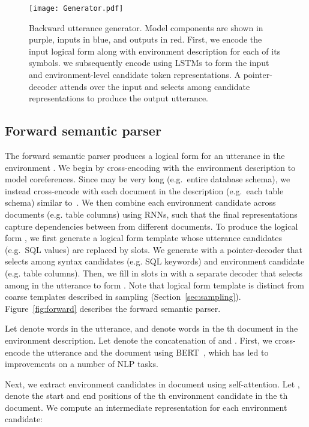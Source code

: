 \documentclass[11pt,a4paper]{article}
\begin{document}
\begin{figure*}[t]
    \centering
    \texttt{[image: Generator.pdf]}
    \caption{
    Backward utterance generator.
    Model components are shown in purple, inputs in blue, and outputs in red.
    First, we encode the input logical form along with environment description for each of its symbols.
    we subsequently encode using LSTMs to form the input and environment-level candidate token representations.
    A pointer-decoder attends over the input and selects among candidate representations to produce the output utterance.
    }
    \vspace{-0.15in}
    \label{fig:backward}
\end{figure*}



\subsection{Forward semantic parser}
\label{sec:parser}

The forward semantic parser  produces a logical form  for an utterance  in the environment .
We begin by cross-encoding  with the environment description  to model coreferences.
Since  may be very long (e.g.~entire database schema), we instead cross-encode  with each document  in the description (e.g.~each table schema) similar to~\citet{zhang2019editing}.
We then combine each environment candidate  across documents (e.g. table columns) using RNNs, such that the final representations capture dependencies between  from different documents.
To produce the logical form , we first generate a logical form template  whose utterance candidates  (e.g.~SQL values) are replaced by slots.
We generate  with a pointer-decoder that selects among syntax candidates  (e.g. SQL keywords) and environment candidate  (e.g. table columns).
Then, we fill in slots in  with a separate decoder that selects among  in the utterance to form .
Note that logical form template  is distinct from coarse templates  described in sampling (Section~\ref{sec:sampling}).
Figure~\ref{fig:forward} describes the forward semantic parser.

Let  denote words in the utterance, and  denote words in the th document in the environment description.
Let  denote the concatenation of  and .
First, we cross-encode the utterance and the document using BERT~\citep{devlin2018bert}, which has led to improvements on a number of NLP tasks.

Next, we extract environment candidates in document  using self-attention.
Let ,  denote the start and end positions of the th environment candidate in the th document.
We compute an intermediate representation  for each environment candidate:
\end{document}
